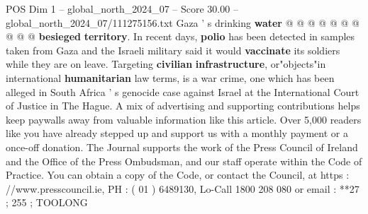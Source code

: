 \begin{textsample}{POS Dim 1 – global\_north\_2024\_07 – Score 30.00 – global\_north\_2024\_07/111275156.txt}
Gaza ' s drinking \textbf{water} @ @ @ @ @ @ @ @ @ @ \textbf{besieged} \textbf{territory}.
In recent days, \textbf{polio} has been detected in samples taken from Gaza and the Israeli military said it would \textbf{vaccinate} its soldiers while they are on leave.
Targeting \textbf{civilian} \textbf{infrastructure}, or"objects"in international \textbf{humanitarian} law terms, is a war crime, one which has been alleged in South Africa ' s genocide case against Israel at the International Court of Justice in The Hague.
A mix of advertising and supporting contributions helps keep paywalls away from valuable information like this article.
Over 5,000 readers like you have already stepped up and support us with a monthly payment or a once-off donation.
The Journal supports the work of the Press Council of Ireland and the Office of the Press Ombudsman, and our staff operate within the Code of Practice.
You can obtain a copy of the Code, or contact the Council, at https : //www.presscouncil.ie, PH : ( 01 ) 6489130, Lo-Call 1800 208 080 or email : **27 ; 255 ; TOOLONG

\end{textsample}
